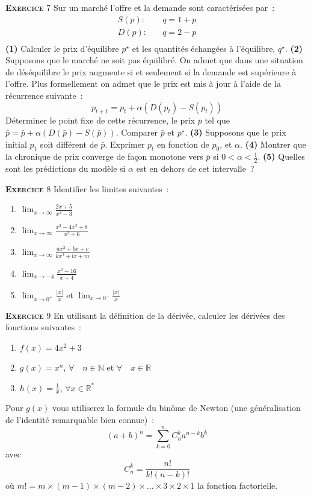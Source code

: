 \documentclass[10pt,a4paper,notitlepage]{article}
\newcommand{\exercice}[1]{\textsc{\textbf{Exercice}} #1}
\begin{document}
\exercice{7} Sur un marché l'offre et la demande sont caractérisées
par :
\[
\begin{split}
  S(p): &\quad q = 1+p\\
  D(p): &\quad q = 2-p\\
\end{split}
\]
\textbf{(1)} Calculer le prix d'équilibre $p^{\star}$ et les quantités échangées à
l'équilibre, $q^{\star}$. \textbf{(2)} Supposons que le marché ne soit pas
équilibré. On admet que dans une situation de déséquilibre le prix
augmente si et seulement si la demande est supérieure à l'offre. Plus
formellement on admet que le prix est mis à jour à l'aide de la
récurrence suivante :
\[
p_{t+1} = p_t + \alpha (D(p_t)-S(p_t))
\]
Déterminer le point fixe de cette récurrence, le prix $\bar p$ tel que
$\bar p = \bar p + \alpha (D(\bar p)-S(\bar p))$. Comparer $\bar p$ et
$p^{\star}$. \textbf{(3)} Supposons que le prix initial $p_1$ soit
différent de $\bar p$. Exprimer $p_t$ en fonction de $p_0$,
et $\alpha$. \textbf{(4)} Montrer que la chronique de prix converge de
façon monotone vers $\bar p$ si $0<\alpha<\frac{1}{2}$. \textbf{(5)}
Quelles sont les prédictions du modèle si $\alpha$ est en dehors de
cet intervalle ?

\bigskip

\exercice{8} Identifier les limites suivantes :
\begin{enumerate}
\item $\lim_{x\rightarrow\infty} \frac{2x+5}{x^2-3}$
\item $\lim_{x\rightarrow\infty} \frac{x^3-4x^2+8}{x^2+6}$
\item $\lim_{x\rightarrow\infty} \frac{ax^2+bx+c}{kx^2+lx+m}$
\item $\lim_{x\rightarrow -4} \frac{x^2-16}{x+4}$
\item $\lim_{x\rightarrow 0^+} \frac{|x|}{x}$ et $\lim_{x\rightarrow 0^-} \frac{|x|}{x}$
\end{enumerate}

\bigskip

\exercice{9} En utilisant la définition de la dérivée, calculer les
dérivées des fonctions suivantes :
\begin{enumerate}
\item $f(x) = 4x^2+3$
\item $g(x) = x^n$, $\forall\quad n\in \mathbb N$ et $\forall\quad x\in \mathbb R$
\item $h(x) = \frac{1}{x}$, $\forall x\in \mathbb R^*$
\end{enumerate}
Pour $g(x)$ vous utiliserez la formule du binôme de Newton (une
généralisation de l'identité remarquable bien connue) :
\[
(a+b)^n = \sum_{k=0}^n C_n^ka^{n-k}b^k
\]
avec
\[
C_n^k = \frac{n!}{k!(n-k)!}
\]
où $m! = m\times(m-1)\times(m-2)\times\dots\times 3\times 2\times 1$
la fonction factorielle.
\end{document}
